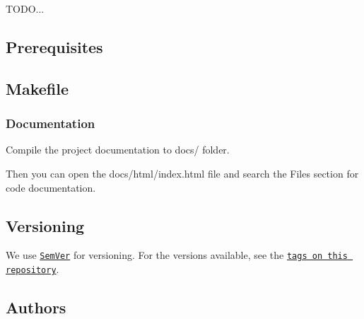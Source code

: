 T\+O\+DO...

\subsection*{Prerequisites}



\subsection*{Makefile}

\subsubsection*{Documentation}

Compile the project documentation to {\ttfamily docs/} folder. 


Then you can open the {\ttfamily docs/html/index.\+html} file and search the {\ttfamily Files} section for code documentation.

\subsection*{Versioning}

We use \href{http://semver.org/}{\tt Sem\+Ver} for versioning. For the versions available, see the \href{https://github.com/FranciscoKnebel/micros/tags}{\tt tags on this repository}.

\subsection*{Authors}

